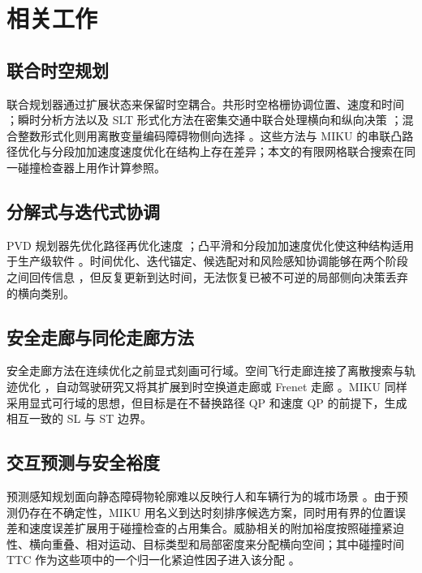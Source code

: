 \section{相关工作}
\label{zh:sec:related_work}

\subsection{联合时空规划}

联合规划器通过扩展状态来保留时空耦合。共形时空格栅协调位置、速度和时间 \citep{mcnaughton2011lattice}；瞬时分析方法以及 SLT 形式化方法在密集交通中联合处理横向和纵向决策 \citep{yang2021_ia_planner,hu2023_hybrid_astar_slt,hu2025_dp_nmpc,qiao2025stjoint}；混合整数形式化则用离散变量编码障碍物侧向选择 \citep{kessler2023}。这些方法与 MIKU 的串联凸路径优化与分段加加速度速度优化在结构上存在差异；本文的有限网格联合搜索在同一碰撞检查器上用作计算参照。

\subsection{分解式与迭代式协调}

PVD 规划器先优化路径再优化速度 \citep{kant1986pvd,werling2010}；凸平滑和分段加加速度优化使这种结构适用于生产级软件 \citep{fan2018baidu,zhou2021dliaps,zhang2020pathqp}。时间优化、迭代锚定、候选配对和风险感知协调能够在两个阶段之间回传信息 \citep{liu2017speed,chen2019em,zhang2024_dp_rcg,han2026_contingency,pathspeedstructured2024}，但反复更新到达时间，无法恢复已被不可逆的局部侧向决策丢弃的横向类别。

\subsection{安全走廊与同伦走廊方法}

安全走廊方法在连续优化之前显式刻画可行域。空间飞行走廊连接了离散搜索与轨迹优化 \citep{liu2017sfc}，自动驾驶研究又将其扩展到时空换道走廊或 Frenet 走廊 \citep{yoon2024stcorridor,frenetcorridor2025}。MIKU 同样采用显式可行域的思想，但目标是在不替换路径 QP 和速度 QP 的前提下，生成相互一致的 SL 与 ST 边界。

\subsection{交互预测与安全裕度}

预测感知规划面向静态障碍物轮廓难以反映行人和车辆行为的城市场景 \citep{yangbo2023ped,jeong2021ml}。由于预测仍存在不确定性，MIKU 用名义到达时刻排序候选方案，同时用有界的位置误差和速度误差扩展用于碰撞检查的占用集合。威胁相关的附加裕度按照碰撞紧迫性、横向重叠、相对运动、目标类型和局部密度来分配横向空间；其中碰撞时间 TTC 作为这些项中的一个归一化紧迫性因子进入该分配 \citep{minderhoud2001extended}。

